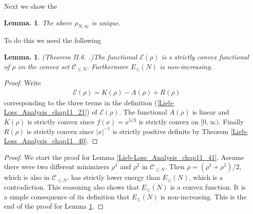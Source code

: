 \documentclass[openany, a4paper, oneside]{jsbook}
\theoremstyle{break}
\theoremstyle{breakdefn}
\newtheorem{lem}[thm]{Lemma.}
\newcommand{\abs}[1]{\left|#1\right|}
\newcommand{\calC}{\mathcal{C}}
\newcommand{\calE}{\mathcal{E}}
\newcommand{\EleqN}{E_{\leq}(N)}
\newcommand{\rhoNinfty}{\rho_{N, \infty}}
\begin{document}
Next we show the
\begin{lem}\label{Lieb-Loss_Analysis_chap11_38}
 The above $\rhoNinfty$ is unique.
\end{lem}
To do this we need the following
\begin{lem}\textup{(Theorem II.6. \cite{LiebSimon1}.)}\label{Lieb-Loss_Analysis_chap11_25}
 The functional $\calE (\rho)$ is s strictly convex functional of $\rho$ on the convex set $\calC_{\leq N}$.
 Furthermore $\EleqN$ is non-increasing.
\end{lem}
\begin{proof}
Write
\begin{align}
 \calE (\rho)
 =
 K (\rho) - A (\rho) + R (\rho)
\end{align}
corresponding to the three terms in the definition (\ref{Lieb-Loss_Analysis_chap11_21}) of $\calE (\rho)$.
The functional $A (\rho)$ is linear and $K (\rho)$ is strictly convex
since $f (x) = x^{5/3}$ is strictly convex on $[0, \infty)$.
Finally $R (\rho)$ is strictly convex since $\abs{x}^{-1}$ is strictly positive definite by Theorem \ref{Lieb-Loss_Analysis_chap11_40}.
\end{proof}

\begin{proof}
We start the proof for Lemma \ref{Lieb-Loss_Analysis_chap11_41}.
Assume there were two different minimizers $\rho^1$ and $\rho^2$ in $\calC_{\leq N}$.
Then $\rho = (\rho^1 + \rho^2) / 2$, which is also in $\calC_{\leq N}$, has strictly lower energy than $\EleqN$,
which is a contradiction.
This reasoning also shows that $\EleqN$ is a convex function.
It is a simple consequence of its definition that $\EleqN$ is non-increasing.
This is the end of the proof for Lemma \ref{Lieb-Loss_Analysis_chap11_38}.
\end{proof}
\end{document}
